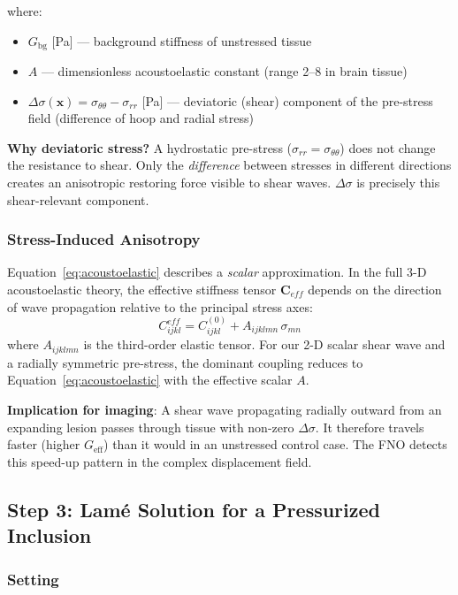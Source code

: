 \documentclass[11pt,letterpaper]{article}
\newcommand{\xvec}{\bm{x}}
\newcommand{\Geff}{G_{\mathrm{eff}}}
\newcommand{\Gbg}{G_{\mathrm{bg}}}
\newcommand{\Dsig}{\Delta\sigma}
\begin{document}
\noindent where:
\begin{itemize}[leftmargin=2em]
    \item $\Gbg$ [Pa] --- background stiffness of unstressed tissue
    \item $A$ --- dimensionless acoustoelastic constant (range 2--8 in brain tissue)
    \item $\Dsig(\xvec) = \sigma_{\theta\theta} - \sigma_{rr}$ [Pa] --- deviatoric
          (shear) component of the pre-stress field (difference of hoop and radial stress)
\end{itemize}

\textbf{Why deviatoric stress?} A hydrostatic pre-stress ($\sigma_{rr} = \sigma_{\theta\theta}$)
does not change the resistance to shear. Only the \emph{difference} between stresses in
different directions creates an anisotropic restoring force visible to shear waves.
$\Dsig$ is precisely this shear-relevant component.

\subsubsection{Stress-Induced Anisotropy}

Equation~\eqref{eq:acoustoelastic} describes a \emph{scalar} approximation. In the full
3-D acoustoelastic theory, the effective stiffness tensor $\mathbf{C}_{eff}$ depends on
the direction of wave propagation relative to the principal stress axes:
\[
    C^{eff}_{ijkl} = C^{(0)}_{ijkl} + A_{ijklmn}\,\sigma_{mn}
\]
where $A_{ijklmn}$ is the third-order elastic tensor. For our 2-D scalar shear wave
and a radially symmetric pre-stress, the dominant coupling reduces to
Equation~\eqref{eq:acoustoelastic} with the effective scalar $A$.

\textbf{Implication for imaging}: A shear wave propagating radially outward from an
expanding lesion passes through tissue with non-zero $\Dsig$. It therefore travels
faster (higher $\Geff$) than it would in an unstressed control case. The FNO detects
this speed-up pattern in the complex displacement field.

\subsection{Step 3: Lam\'{e} Solution for a Pressurized Inclusion}

\subsubsection{Setting}
\end{document}
